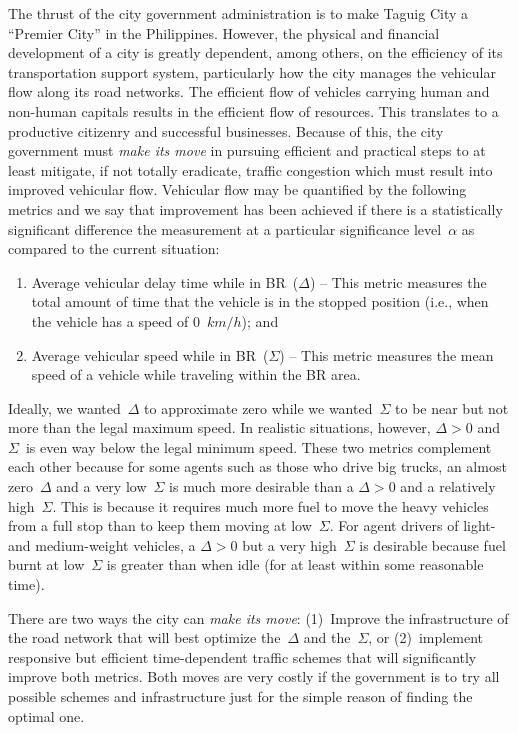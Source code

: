 \documentclass[preprint]{./acm_proc_article-sp}
\begin{document}
The thrust of the city government administration is to make Taguig City a ``Premier City'' in the Philippines. However,  the physical and financial development of a city is greatly dependent, among others, on the efficiency of its transportation support system, particularly how the city manages the vehicular flow along its road networks. The efficient flow of vehicles carrying human and non-human capitals results in the efficient flow of resources. This translates to a productive citizenry and successful businesses. Because of this, the city government must {\em make its move} in pursuing efficient and practical steps to at least mitigate, if not totally eradicate, traffic congestion which must result into improved vehicular flow. Vehicular flow may be quantified by the following metrics and we say that improvement has been achieved if there is a statistically significant difference the measurement at a particular significance level~$\alpha$ as compared to the current situation:
\begin{enumerate}
\item Average vehicular delay time while in BR~($\Delta$) -- This metric measures the total amount of time that the vehicle is in the stopped position (i.e., when the vehicle has a speed of 0~$km/h$); and
\item Average vehicular speed while in BR~($\Sigma$) -- This metric measures the mean speed of a vehicle while traveling within the BR area. 
\end{enumerate}
Ideally, we wanted~$\Delta$ to approximate zero while we wanted~$\Sigma$ to be near but not more than the legal maximum speed. In realistic situations, however, $\Delta>0$ and $\Sigma$~is even way below the legal minimum speed. These two metrics complement each other because for some agents such as those who drive big trucks, an almost zero~$\Delta$ and a very low~$\Sigma$ is much more desirable than a $\Delta>0$ and a relatively high~$\Sigma$. This is because it requires much more fuel to move the heavy vehicles from a full stop than to keep them moving at low~$\Sigma$. For agent drivers of light- and medium-weight vehicles, a $\Delta>0$ but a very high~$\Sigma$ is desirable because fuel burnt at low~$\Sigma$ is greater than when idle (for at least within some reasonable time).

There are two ways the city can {\em make its move}: (1)~Improve the infrastructure of the road network that will best optimize the~$\Delta$ and the~$\Sigma$, or (2)~implement responsive but efficient time-dependent traffic schemes that will significantly improve both metrics. Both moves are very costly if the government is to try all possible schemes and infrastructure just for the simple reason of finding the optimal one. 
\end{document}
